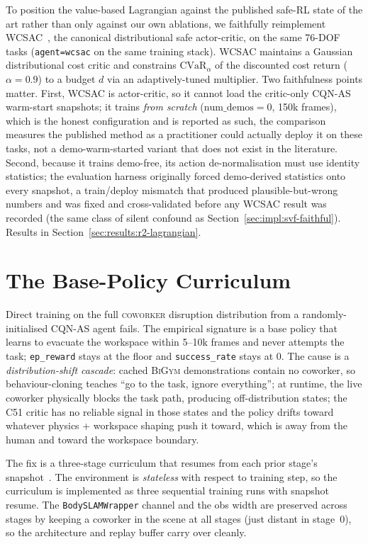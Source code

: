 \documentclass[11pt,a4paper]{report}
\newcommand{\cvar}{\ensuremath{\mathrm{CVaR}}}
\newcommand{\bigym}{\textsc{BiGym}}
\newcommand{\cqnas}{CQN-AS}
\newcommand{\coworker}{\textsc{coworker}}
\begin{document}
To position the value-based Lagrangian against the published safe-RL
state of the art rather than only against our own ablations, we
faithfully reimplement WCSAC~\cite{yang2021wcsac,yang2023wcsacjournal},
the canonical distributional safe actor-critic, on the same 76-DOF tasks
(\texttt{agent=wcsac} on the same training stack). WCSAC maintains a
Gaussian distributional cost critic and constrains
$\cvar_{\alpha}$ of the discounted cost return ($\alpha = 0.9$) to a
budget $d$ via an adaptively-tuned multiplier. Two faithfulness
points matter. First, WCSAC is actor-critic, so it cannot load the
critic-only \cqnas{} warm-start snapshots; it trains \emph{from
scratch} ($\text{num\_demos} = 0$, 150k frames), which is the honest
configuration and is reported as such, the comparison measures the
published method as a practitioner could actually deploy it on these
tasks, not a demo-warm-started variant that does not exist in the
literature. Second, because it trains demo-free, its action
de-normalisation must use identity statistics; the evaluation harness
originally forced demo-derived statistics onto every snapshot, a
train/deploy mismatch that produced plausible-but-wrong numbers and
was fixed and cross-validated before any WCSAC result was recorded
(the same class of silent confound as
Section~\ref{sec:impl:svf-faithful}). Results in
Section~\ref{sec:results:r2-lagrangian}.

\section{The Base-Policy Curriculum}
\label{sec:method:curriculum}

Direct training on the full \coworker{} disruption distribution
from a randomly-initialised \cqnas{} agent fails. The empirical
signature is a base policy that learns to evacuate the workspace
within 5--10k frames and never attempts the task;
\texttt{ep\_reward} stays at the floor and \texttt{success\_rate}
stays at 0. The cause is a \emph{distribution-shift cascade}:
cached \bigym{} demonstrations contain no coworker, so
behaviour-cloning teaches ``go to the task, ignore everything''; at
runtime, the live coworker physically blocks the task path,
producing off-distribution states; the C51 critic has no reliable
signal in those states and the policy drifts toward whatever
physics + workspace shaping push it toward, which is away from the
human and toward the workspace boundary.

The fix is a three-stage curriculum that resumes from each prior
stage's snapshot~\cite{narvekar2020curriculum}. The environment is
\emph{stateless} with respect to training step, so the curriculum
is implemented as three sequential training runs with snapshot
resume. The \texttt{BodySLAMWrapper} channel and the obs width are
preserved across stages by keeping a coworker in the scene at all
stages (just distant in stage~0), so the architecture and replay
buffer carry over cleanly.
\end{document}
